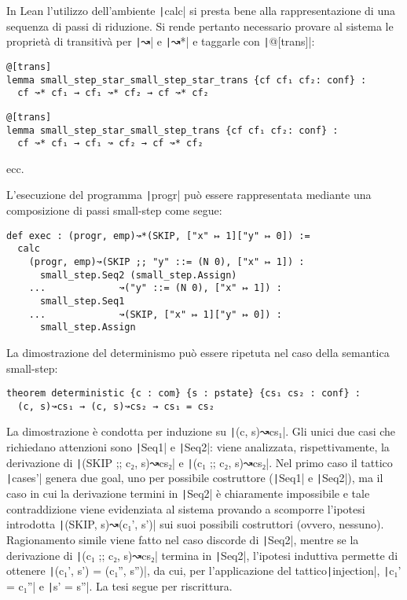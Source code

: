 In Lean l'utilizzo dell'ambiente \texttt|calc| si presta bene alla rappresentazione di una sequenza di passi di riduzione.  Si rende pertanto necessario provare al sistema le proprietà di transitivà per \texttt|↝| e \texttt|↝*| e taggarle con \texttt|@[trans]|:
\begin{verbatim}
@[trans]
lemma small_step_star_small_step_star_trans {cf cf₁ cf₂: conf} :
  cf ↝* cf₁ → cf₁ ↝* cf₂ → cf ↝* cf₂
\end{verbatim}
\vspace{-2em}
\begin{verbatim}
@[trans]
lemma small_step_star_small_step_trans {cf cf₁ cf₂: conf} :
  cf ↝* cf₁ → cf₁ ↝ cf₂ → cf ↝* cf₂ 
\end{verbatim}
ecc. 

L'esecuzione del programma \texttt|progr| può essere rappresentata mediante una composizione di passi small-step come segue:
\begin{verbatim}
def exec : (progr, emp)↝*(SKIP, ["x" ↦ 1]["y" ↦ 0]) :=
  calc
    (progr, emp)↝(SKIP ;; "y" ::= (N 0), ["x" ↦ 1]) : 
      small_step.Seq2 (small_step.Assign)
    ...             ↝("y" ::= (N 0), ["x" ↦ 1]) :
      small_step.Seq1
    ...             ↝(SKIP, ["x" ↦ 1]["y" ↦ 0]) :
      small_step.Assign
\end{verbatim}

La dimostrazione del determinismo può essere ripetuta nel caso della semantica small-step:
\begin{verbatim}
theorem deterministic {c : com} {s : pstate} {cs₁ cs₂ : conf} : 
  (c, s)↝cs₁ → (c, s)↝cs₂ → cs₁ = cs₂
\end{verbatim}
La dimostrazione è condotta per induzione su \texttt|(c, s)↝cs₁|. Gli unici due casi che richiedano attenzioni sono \texttt|Seq1| e \texttt|Seq2|: viene analizzata, rispettivamente, la derivazione di \texttt|(SKIP ;; c₂, s)↝cs₂| e \texttt|(c₁ ;; c₂, s)↝cs₂|. Nel primo caso il tattico \texttt|cases'| genera due goal, uno per possibile costruttore (\texttt|Seq1| e \texttt|Seq2|), ma il caso in cui la derivazione termini in \texttt|Seq2| è chiaramente impossibile e tale contraddizione viene evidenziata al sistema provando a scomporre l'ipotesi introdotta \texttt|(SKIP, s)↝(c₁', s')| sui suoi possibili costruttori (ovvero, nessuno). Ragionamento simile viene fatto nel caso discorde di \texttt|Seq2|, mentre se la derivazione di \texttt|(c₁ ;; c₂, s)↝cs₂| termina in \texttt|Seq2|,  l'ipotesi induttiva permette di ottenere \texttt|(c₁', s') = (c₁'', s'')|, da cui, per l'applicazione del tattico\texttt|injection|, \texttt|c₁' = c₁''| e \texttt|s' = s''|. La tesi segue per riscrittura.

